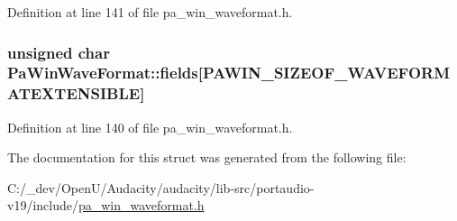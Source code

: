 Definition at line 141 of file pa\+\_\+win\+\_\+waveformat.\+h.

\subsubsection[{\texorpdfstring{fields}{fields}}]{\setlength{\rightskip}{0pt plus 5cm}unsigned char Pa\+Win\+Wave\+Format\+::fields\mbox{[}{\bf P\+A\+W\+I\+N\+\_\+\+S\+I\+Z\+E\+O\+F\+\_\+\+W\+A\+V\+E\+F\+O\+R\+M\+A\+T\+E\+X\+T\+E\+N\+S\+I\+B\+LE}\mbox{]}}\hypertarget{struct_pa_win_wave_format_a1857b636da839476d43d6ee1220b273b}{}\label{struct_pa_win_wave_format_a1857b636da839476d43d6ee1220b273b}


Definition at line 140 of file pa\+\_\+win\+\_\+waveformat.\+h.



The documentation for this struct was generated from the following file\+:\begin{DoxyCompactItemize}
\item 
C\+:/\+\_\+dev/\+Open\+U/\+Audacity/audacity/lib-\/src/portaudio-\/v19/include/\hyperlink{pa__win__waveformat_8h}{pa\+\_\+win\+\_\+waveformat.\+h}\end{DoxyCompactItemize}

